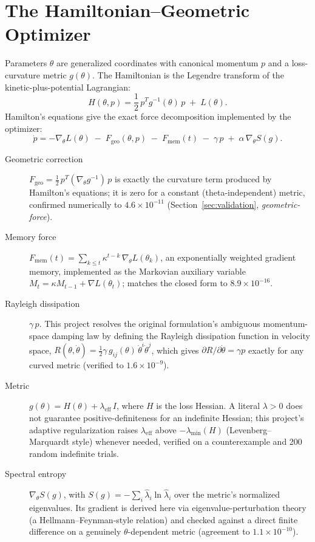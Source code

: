 \documentclass[11pt]{article}
\begin{document}
\section{The Hamiltonian--Geometric Optimizer}
\label{sec:theory}

Parameters $\theta$ are generalized coordinates with canonical momentum $p$ and a
loss-curvature metric $g(\theta)$. The Hamiltonian is the Legendre transform of the
kinetic-plus-potential Lagrangian:
\begin{equation}
H(\theta, p) = \frac{1}{2}\, p^{T} g^{-1}(\theta)\, p \;+\; L(\theta).
\end{equation}
Hamilton's equations give the exact force decomposition implemented by the optimizer:
\begin{equation}
\dot p = -\nabla_\theta L(\theta) \;-\; F_{\mathrm{geo}}(\theta, p) \;-\; F_{\mathrm{mem}}(t)
\;-\; \gamma\, p \;+\; \alpha\, \nabla_\theta S(g).
\label{eq:force-decomposition}
\end{equation}

\begin{description}
\item[Geometric correction] $F_{\mathrm{geo}} = \frac{1}{2}\, p^{T}(\nabla_\theta g^{-1})\, p$
is exactly the curvature term produced by Hamilton's equations; it is zero for a constant
(theta-independent) metric, confirmed numerically to $4.6\times10^{-11}$
(Section~\ref{sec:validation}, \emph{geometric-force}).
\item[Memory force] $F_{\mathrm{mem}}(t) = \sum_{k\le t} \kappa^{t-k}\, \nabla_\theta L(\theta_k)$,
an exponentially weighted gradient memory, implemented as the Markovian auxiliary variable
$M_t = \kappa M_{t-1} + \nabla L(\theta_t)$; matches the closed form to $8.9\times10^{-16}$.
\item[Rayleigh dissipation] $\gamma\, p$. This project resolves the original formulation's
ambiguous momentum-space damping law by defining the Rayleigh dissipation function in
velocity space, $R(\theta, \dot\theta) = \frac{1}{2}\gamma\, g_{ij}(\theta)\,\dot\theta^i\dot\theta^j$,
which gives $\partial R/\partial\dot\theta = \gamma p$ exactly for any curved metric (verified
to $1.6\times10^{-9}$).
\item[Metric] $g(\theta) = H(\theta) + \lambda_{\mathrm{eff}}\, I$, where $H$ is the loss
Hessian. A literal $\lambda > 0$ does not guarantee positive-definiteness for an indefinite
Hessian; this project's adaptive regularization raises $\lambda_{\mathrm{eff}}$ above
$-\lambda_{\min}(H)$ (Levenberg--Marquardt style) whenever needed, verified on a
counterexample and 200 random indefinite trials.
\item[Spectral entropy] $\nabla_\theta S(g)$, with
$S(g) = -\sum_i \hat\lambda_i \ln \hat\lambda_i$ over the metric's normalized eigenvalues.
Its gradient is derived here via eigenvalue-perturbation theory (a Hellmann--Feynman-style
relation) and checked against a direct finite difference on a genuinely $\theta$-dependent
metric (agreement to $1.1\times10^{-10}$).
\end{description}
\end{document}

